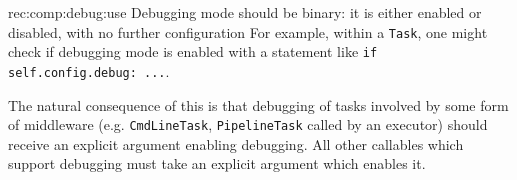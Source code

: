 \begin{recommendation}
    {rec:comp:debug:use}
    {Debugging mode should be binary: it is either enabled or disabled, with no further configuration}
    For example, within a \texttt{Task}, one might check if debugging mode is
    enabled with a statement like \texttt{if self.config.debug: ...}.
\end{recommendation}

The natural consequence of this is that debugging of tasks involved by some
form of middleware (e.g. \texttt{CmdLineTask}, \texttt{PipelineTask} called by
an executor) should receive an explicit argument enabling debugging. All other
callables which support debugging must take an explicit argument which enables
it.
